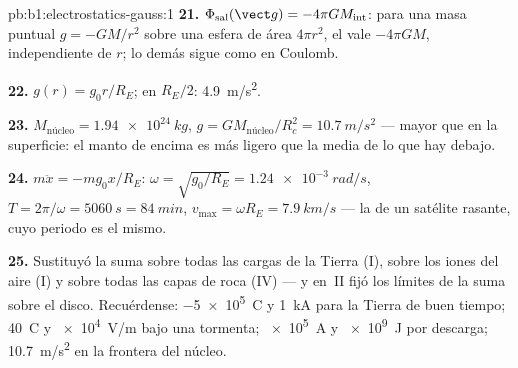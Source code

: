 \begin{solution}{pb:b1:electrostatics-gauss:1}
\textbf{21.} $\Phi_{\text{sal}}(\vect g) = -4\pi GM_{\text{int}}$: para una masa puntual
$g = -GM/r^2$ sobre una esfera de área $4\pi r^2$, el  vale $-4\pi GM$,
independiente de $r$; lo demás sigue como en Coulomb.

\textbf{22.} $g(r) = g_0r/R_E$; en $R_E/2$: \qty{4.9}{m/s^2}.

\textbf{23.} $M_{\text{núcleo}} = \qty{1.94e24}{kg}$, $g = GM_{\text{núcleo}}/R_c^2 =
\qty{10.7}{m/s^2}$ --- mayor que en la superficie: el manto de encima es
más ligero que la media de lo que hay debajo.

\textbf{24.} $m\ddot x = -mg_0x/R_E$: $\omega = \sqrt{g_0/R_E} = \qty{1.24e-3}{rad/s}$,
$T = 2\pi/\omega = \qty{5060}{s} = \qty{84}{min}$, $v_{\max} = \omega R_E =
\qty{7.9}{km/s}$ --- la  de un satélite rasante, cuyo
periodo es el mismo.

\textbf{25.} Sustituyó la suma sobre todas las cargas de la Tierra (I),
sobre los iones del aire (I) y sobre todas las capas de roca (IV) --- y
en~II fijó los límites de la suma sobre el disco. Recuérdense: \qty{-5e5}{C} y
\qty{1}{kA} para la Tierra de buen tiempo; \qty{40}{C} y \qty{e4}{V/m} bajo una
tormenta; \qty{e5}{A} y \qty{e9}{J} por descarga; \qty{10.7}{m/s^2} en la
frontera del núcleo.
\end{solution}

